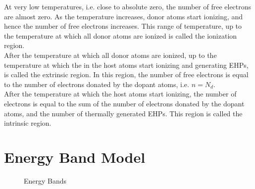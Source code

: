 \documentclass[titlepage, fleqn, a4paper, 12pt, twoside]{article}
\theoremstyle{definition}
\theoremstyle{theorem}
\begin{document}
At very low temperatures, i.e. close to absolute zero, the number of free electrons are almost zero.
As the temperature increases, donor atoms start ionizing, and hence the number of free electrons increases.
This range of temperature, up to the temperature at which all donor atoms are ionized is called the ionization region.\\
After the temperature at which all donor atoms are ionized, up to the temperature at which the in the host atoms start ionizing and generating EHPs, is called the extrinsic region.
In this region, the number of free electrons is equal to the number of electrons donated by the dopant atoms, i.e. $n = N_d$.\\
After the temperature at which the host atoms start ionizing, the number of electrons is equal to the sum of the number of electrons donated by the dopant atoms, and the number of thermally generated EHPs.
This region is called the intrinsic region.

\section{Energy Band Model}

\begin{figure}[h]
	\centering
	\caption{Energy Bands}
\end{figure}
\end{document}
